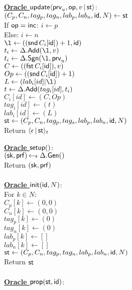\documentclass{article}
\begin{document}
\begin{figure}
{\begin{minipage}[t]{0.5\textwidth}
	\underline{\bf Oracle $\mathsf{update}\langle\mathsf{prv}_u,\mathsf{op},v\,|\,\mathsf{st}\rangle $}: \\
	  $(C_p,C_n,tag_p,tag_n,lab_p,lab_n,\mathsf{id},N) \gets \mathsf{st}$\\
	  If $\mathsf{op} = \mathsf{inc}$: $i \gets p$\\
	  Else: $i \gets n$\\
	  $\l \gets ((\mathsf{snd} \,C_i[\id]) + 1,\id)$\\
	  $t_i \gets \Delta.\Add(\l,v)$\\
	  $t_i \gets \Delta.\Sgn(\l,\prms_u)$\\
	  $C \gets ((\mathsf{fst} \,C_i[\mathsf{id}]),v)$\\
	  $Op \gets ((\mathsf{snd} \,C_i[\mathsf{id}]) + 1)$\\
	  $L \gets (lab_i[id] | \l)$\\
	  $t \gets \Delta.\mathsf{Add}(tag_i[id],t_i)$\\
	  $C_i[id] \gets (C,Op)$\\
	  $tag_i[id] \gets (t)$\\
	  $lab_i[id] \gets (L)$\\
	  $\mathsf{st} \gets (C_p,C_n,tag_p,tag_s,lab_p,lab_n,\mathsf{id},N)$\\
	  Return $\langle\epsilon\,|\,\mathsf{st}\rangle_t$
     \end{minipage}
     \begin{minipage}[t]{.44\linewidth}
       \underline{\bf Oracle $\mathsf{setup}() $}: \\
	  $(\mathsf{sk},\mathsf{prf}) \operatorname{{\leftarrow\!\!\mbox{\tiny${\$}$\normalsize}}\,} \Delta.\mathsf{Gen}()$\\
	  Return $(\mathsf{sk},\mathsf{prf})$\\
	  \\
	\underline{\bf Oracle $\mathsf{init}(\mathsf{id}, N)$}: \\
	  For $k \in N$:\\
	  \phantom{x}$C_p[k] \gets (0,0)$\\
	  \phantom{x}$C_n[k] \gets (0,0)$\\
	  \phantom{x}$tag_p[k] \gets (0)$\\
	  \phantom{x}$tag_n[k] \gets (0)$\\
	  \phantom{x}$lab_p[k] \gets []$\\
	  \phantom{x}$lab_n[k] \gets []$\\
	  $\mathsf{st} \gets (C_p, C_n, tag_p, tag_n, lab_p, lab_n, \mathsf{id}, N)$ \\
	  Return $\mathsf{st}$\\
	  \\
       	\underline{\bf Oracle $\mathsf{prop}(\mathsf{st}, \mathsf{id})$}: \\

\end{minipage}}
\end{figure}
\end{document}
